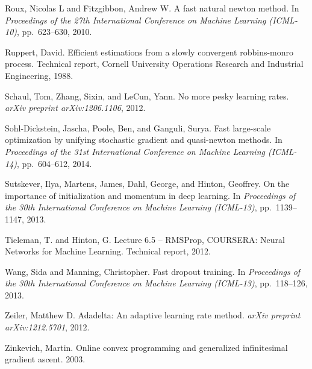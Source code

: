 \documentclass[11pt]{article}
\begin{document}
\begin{list}{}{%
  \setlength{\leftmargin}{1.5em}%
  \setlength{\itemindent}{-1.5em}%
  \setlength{\itemsep}{0.5em}%
  \setlength{\parsep}{0pt}%
}

\item Roux, Nicolas L and Fitzgibbon, Andrew W. A fast natural
newton method. In \emph{Proceedings of the 27th International
Conference on Machine Learning (ICML-10)}, pp.~623--630, 2010.

\item Ruppert, David. Efficient estimations from a slowly
convergent robbins-monro process. Technical report, Cornell
University Operations Research and Industrial Engineering, 1988.

\item Schaul, Tom, Zhang, Sixin, and LeCun, Yann. No more pesky
learning rates. \emph{arXiv preprint arXiv:1206.1106}, 2012.

\item Sohl-Dickstein, Jascha, Poole, Ben, and Ganguli, Surya.
Fast large-scale optimization by unifying stochastic gradient
and quasi-newton methods. In \emph{Proceedings of the 31st
International Conference on Machine Learning (ICML-14)},
pp.~604--612, 2014.

\item Sutskever, Ilya, Martens, James, Dahl, George, and Hinton,
Geoffrey. On the importance of initialization and momentum in
deep learning. In \emph{Proceedings of the 30th International
Conference on Machine Learning (ICML-13)}, pp.~1139--1147, 2013.

\item Tieleman, T. and Hinton, G. Lecture 6.5 -- RMSProp,
COURSERA: Neural Networks for Machine Learning. Technical
report, 2012.

\item Wang, Sida and Manning, Christopher. Fast dropout training.
In \emph{Proceedings of the 30th International Conference on
Machine Learning (ICML-13)}, pp.~118--126, 2013.

\item Zeiler, Matthew D. Adadelta: An adaptive learning rate
method. \emph{arXiv preprint arXiv:1212.5701}, 2012.

\item Zinkevich, Martin. Online convex programming and
generalized infinitesimal gradient ascent. 2003.

\end{list}

\end{document}
